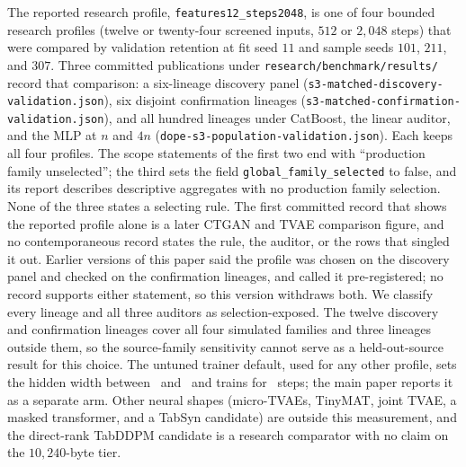 \documentclass{article}
\begin{document}
The reported research profile, \texttt{features12\_\allowbreak{}steps2048}, is one of four bounded research profiles (twelve or twenty-four screened inputs, $512$ or $2{,}048$ steps) that were compared by validation retention at fit seed $11$ and sample seeds $101$, $211$, and $307$. Three committed publications under \texttt{research/\allowbreak{}benchmark/\allowbreak{}results/} record that comparison: a six-lineage discovery panel (\texttt{s3-matched-\allowbreak{}discovery-\allowbreak{}validation.json}), six disjoint confirmation lineages (\texttt{s3-matched-\allowbreak{}confirmation-\allowbreak{}validation.json}), and all hundred lineages under CatBoost, the linear auditor, and the MLP at $n$ and $4n$ (\texttt{dope-s3-\allowbreak{}population-\allowbreak{}validation.json}). Each keeps all four profiles. The scope statements of the first two end with ``production family unselected''; the third sets the field \texttt{global\_\allowbreak{}family\_\allowbreak{}selected} to false, and its report describes descriptive aggregates with no production family selection. None of the three states a selecting rule. The first committed record that shows the reported profile alone is a later CTGAN and TVAE comparison figure, and no contemporaneous record states the rule, the auditor, or the rows that singled it out. Earlier versions of this paper said the profile was chosen on the discovery panel and checked on the confirmation lineages, and called it pre-registered; no record supports either statement, so this version withdraws both. We classify every lineage and all three auditors as selection-exposed. The twelve discovery and confirmation lineages cover all four simulated families and three lineages outside them, so the source-family sensitivity cannot serve as a held-out-source result for this choice. The untuned trainer default, used for any other profile, sets the hidden width between \ProductionWidthLo\ and \ProductionWidthHi\ and trains for \ProductionSteps\ steps; the main paper reports it as a separate arm. Other neural shapes (micro-TVAEs, TinyMAT, joint TVAE, a masked transformer, and a TabSyn candidate) are outside this measurement, and the direct-rank TabDDPM candidate is a research comparator with no claim on the $10{,}240$-byte tier.
\end{document}
